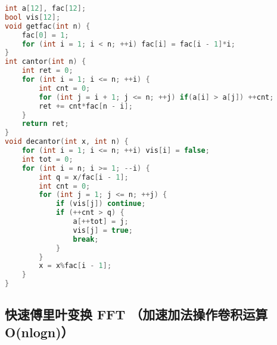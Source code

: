 \begin{lstlisting}[language=C++]
int a[12], fac[12];
bool vis[12];
void getfac(int n) {
    fac[0] = 1;
    for (int i = 1; i < n; ++i) fac[i] = fac[i - 1]*i;
}
int cantor(int n) {
    int ret = 0;
    for (int i = 1; i <= n; ++i) {
        int cnt = 0;
        for (int j = i + 1; j <= n; ++j) if(a[i] > a[j]) ++cnt;
        ret += cnt*fac[n - i];
    }
    return ret;
}
void decantor(int x, int n) {
    for (int i = 1; i <= n; ++i) vis[i] = false;
    int tot = 0;
    for (int i = n; i >= 1; --i) {
        int q = x/fac[i - 1];
        int cnt = 0;
        for (int j = 1; j <= n; ++j) {
            if (vis[j]) continue;
            if (++cnt > q) {
                a[++tot] = j;
                vis[j] = true;
                break;
            }
        }
        x = x%fac[i - 1];
    }
}
\end{lstlisting}

\subsection{快速傅里叶变换 FFT （加速加法操作卷积运算 O(nlogn)）}

